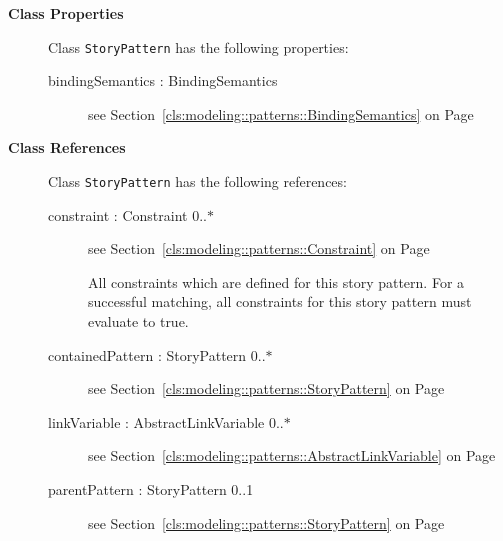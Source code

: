 \begin{description}

	\item[\textbf{Class Properties}] Class \texttt{StoryPattern} has the following properties:
	\begin{description}
\item[bindingSemantics : BindingSemantics 	]
see Section~\ref{cls:modeling::patterns::BindingSemantics} on Page~\pageref{cls:modeling::patterns::BindingSemantics}\hspace{\fill}
\nopagebreak


	
	\end{description}
	
	\item[\textbf{Class References}] Class \texttt{StoryPattern} has the following references:
	\begin{description}
\item[constraint : Constraint 			0..$*$]
see Section~\ref{cls:modeling::patterns::Constraint} on Page~\pageref{cls:modeling::patterns::Constraint}\hspace{\fill}
\nopagebreak


	
			
All constraints which are defined for this story pattern. For a successful matching, all constraints for this story pattern must evaluate to true.	
		
	
\item[containedPattern : StoryPattern 			0..$*$]
see Section~\ref{cls:modeling::patterns::StoryPattern} on Page~\pageref{cls:modeling::patterns::StoryPattern}\hspace{\fill}
\nopagebreak


	
\item[linkVariable : AbstractLinkVariable 			0..$*$]
see Section~\ref{cls:modeling::patterns::AbstractLinkVariable} on Page~\pageref{cls:modeling::patterns::AbstractLinkVariable}\hspace{\fill}
\nopagebreak


	
\item[parentPattern : StoryPattern 			0..1]
see Section~\ref{cls:modeling::patterns::StoryPattern} on Page~\pageref{cls:modeling::patterns::StoryPattern}\hspace{\fill}
\nopagebreak



\end{description}
\end{description}
